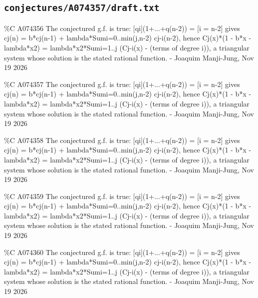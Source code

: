 \subsection*{\texttt{conjectures/A074357/draft.txt}}
{\small\raggedright\ttfamily
\%C A074356 The conjectured g.f. is true: [qi](1+...+q(n-2)) = [i = n-2] gives cj(n) = b*cj(n-1) + lambda*Sumi=0..min(j,n-2) cj-i(n-2), hence Cj(x)*(1 - b*x - lambda*x2) = lambda*x2*Sumi=1..j (Cj-i(x) - (terms of degree  i)), a triangular system whose solution is the stated rational function. - Joaquim Manji-Jung, Nov 19 2026\par
\%C A074357 The conjectured g.f. is true: [qi](1+...+q(n-2)) = [i = n-2] gives cj(n) = b*cj(n-1) + lambda*Sumi=0..min(j,n-2) cj-i(n-2), hence Cj(x)*(1 - b*x - lambda*x2) = lambda*x2*Sumi=1..j (Cj-i(x) - (terms of degree  i)), a triangular system whose solution is the stated rational function. - Joaquim Manji-Jung, Nov 19 2026\par
\%C A074358 The conjectured g.f. is true: [qi](1+...+q(n-2)) = [i = n-2] gives cj(n) = b*cj(n-1) + lambda*Sumi=0..min(j,n-2) cj-i(n-2), hence Cj(x)*(1 - b*x - lambda*x2) = lambda*x2*Sumi=1..j (Cj-i(x) - (terms of degree  i)), a triangular system whose solution is the stated rational function. - Joaquim Manji-Jung, Nov 19 2026\par
\%C A074359 The conjectured g.f. is true: [qi](1+...+q(n-2)) = [i = n-2] gives cj(n) = b*cj(n-1) + lambda*Sumi=0..min(j,n-2) cj-i(n-2), hence Cj(x)*(1 - b*x - lambda*x2) = lambda*x2*Sumi=1..j (Cj-i(x) - (terms of degree  i)), a triangular system whose solution is the stated rational function. - Joaquim Manji-Jung, Nov 19 2026\par
\%C A074360 The conjectured g.f. is true: [qi](1+...+q(n-2)) = [i = n-2] gives cj(n) = b*cj(n-1) + lambda*Sumi=0..min(j,n-2) cj-i(n-2), hence Cj(x)*(1 - b*x - lambda*x2) = lambda*x2*Sumi=1..j (Cj-i(x) - (terms of degree  i)), a triangular system whose solution is the stated rational function. - Joaquim Manji-Jung, Nov 19 2026\par
}
